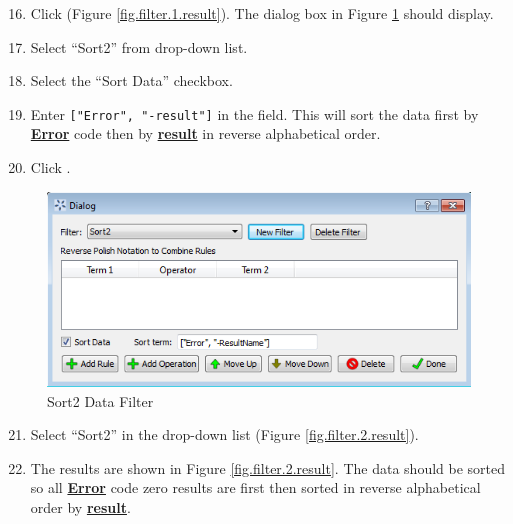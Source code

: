 \begin{enumerate}
	\setcounter{enumi}{15}
	\item Click  (Figure \ref{fig.filter.1.result}). The dialog box in Figure \ref{fig.filter.2} should display.
	\item Select ``Sort2'' from  drop-down list.
	\item Select the ``Sort Data'' checkbox.
	\item Enter \verb|["Error", "-result"]| in the  field.  This will sort the data first by \textbf{\underline{Error}} code then by \textbf{\underline{result}} in reverse alphabetical order.
	\item Click .
\end{enumerate}

\begin{figure}[H]
	\begin{center}
		\includegraphics[scale=0.55]{Chapt_flowsheet/figs/filter_2}
		\caption{Sort2 Data Filter}
		\label{fig.filter.2}
	\end{center}
\end{figure}

\begin{enumerate}
	\setcounter{enumi}{20}
	\item Select ``Sort2'' in the  drop-down list (Figure \ref{fig.filter.2.result}). 
	\item The results are shown in Figure \ref{fig.filter.2.result}. The data should be sorted so all \textbf{\underline{Error}} code zero results are first then sorted in reverse alphabetical order by \textbf{\underline{result}}.
\end{enumerate}

